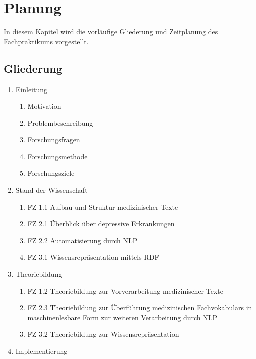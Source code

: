 \chapter{Planung}

In diesem Kapitel wird die vorläufige Gliederung und Zeitplanung des Fachpraktikums vorgestellt.

\section{Gliederung}

\begin{enumerate}
\item Einleitung

\begin{enumerate}[label=\theenumi.\arabic*]
\item Motivation
\item Problembeschreibung
\item Forschungsfragen
\item Forschungsmethode
\item Forschungsziele
\end{enumerate}

\item Stand der Wissenschaft

\begin{enumerate}[label=\theenumi.\arabic*]
\item FZ 1.1 Aufbau und Struktur medizinischer Texte
\item FZ 2.1 Überblick über depressive Erkrankungen
\item FZ 2.2 Automatisierung durch NLP
\item FZ 3.1 Wissensrepräsentation mittels RDF
\end{enumerate}

\item Theoriebildung

\begin{enumerate}[label=\theenumi.\arabic*]
\item FZ 1.2 Theoriebildung zur Vorverarbeitung medizinischer Texte
\item FZ 2.3 Theoriebildung zur Überführung medizinischen Fachvokabulars
in maschinenlesbare Form zur weiteren Verarbeitung durch NLP
\item FZ 3.2 Theoriebildung zur Wissensrepräsentation
\end{enumerate}

\item Implementierung


\end{enumerate}
